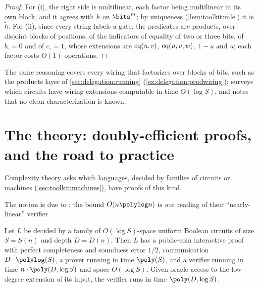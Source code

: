 \begin{refsection}
\begin{proof}
For (i), the right side is multilinear, each factor being multilinear in its own block, and it agrees with $h$ on $\bits^m$; by uniqueness (\cref{lem:toolkit:mle}) it is $\tilde h$. For (ii), since every string labels a gate, the predicates are products, over disjoint blocks of positions, of the indicators of equality of two or three bits, of $b_\circ=0$ and of $c_\circ=1$, whose extensions are $\mathrm{eq}(u,v)$, $\mathrm{eq}(u,v,w)$, $1-u$ and $u$; each factor costs $O(1)$ operations.
\end{proof}

The same reasoning covers every wiring that factorizes over blocks of bits, such as the products layer of \cref{sec:delegation:running} (\cref{ex:delegation:prodwiring}); \textcite[\S4.6.6]{Thaler2022} surveys which circuits have wiring extensions computable in time $O(\log S)$, and notes that no clean characterization is known.

\section{The theory: doubly-efficient proofs, and the road to practice}\label{sec:delegation:reach}

Complexity theory asks which languages, decided by families of circuits or machines (\cref{sec:toolkit:machines}), have proofs of this kind.


The notion is due to \textcite{GoldwasserKalaiRothblum2015}; the bound $O(n\polylog n)$ is our reading of their ``nearly-linear'' verifier.

\begin{theorem}\label{thm:delegation:uniform}
Let $L$ be decided by a family of $O(\log S)$-space uniform Boolean circuits of size $S=S(n)$ and depth $D=D(n)$. Then $L$ has a public-coin interactive proof with perfect completeness and soundness error $1/2$, communication $D\cdot\polylog(S)$, a prover running in time $\poly(S)$, and a verifier running in time $n\cdot\poly(D,\log S)$ and space $O(\log S)$. Given oracle access to the low-degree extension of its input, the verifier runs in time $\poly(D,\log S)$.
\end{theorem}


\end{refsection}
